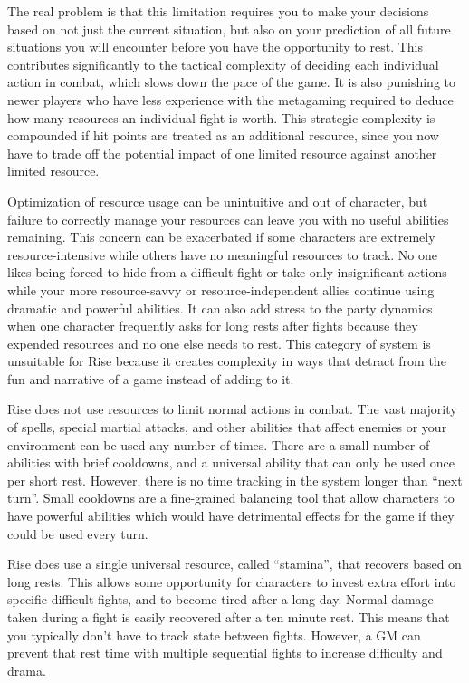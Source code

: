     The real problem is that this limitation requires you to make your decisions based on not just the current situation, but also on your prediction of all future situations you will encounter before you have the opportunity to rest.
    This contributes significantly to the tactical complexity of deciding each individual action in combat, which slows down the pace of the game.
    It is also punishing to newer players who have less experience with the metagaming required to deduce how many resources an individual fight is worth.
    This strategic complexity is compounded if hit points are treated as an additional resource, since you now have to trade off the potential impact of one limited resource against another limited resource.

    Optimization of resource usage can be unintuitive and out of character, but failure to correctly manage your resources can leave you with no useful abilities remaining.
    This concern can be exacerbated if some characters are extremely resource-intensive while others have no meaningful resources to track.
    No one likes being forced to hide from a difficult fight or take only insignificant actions while your more resource-savvy or resource-independent allies continue using dramatic and powerful abilities.
    It can also add stress to the party dynamics when one character frequently asks for long rests after fights because they expended resources and no one else needs to rest.
    This category of system is unsuitable for Rise because it creates complexity in ways that detract from the fun and narrative of a game instead of adding to it.

    Rise does not use resources to limit normal actions in combat.
    The vast majority of spells, special martial attacks, and other abilities that affect enemies or your environment can be used any number of times.
    There are a small number of abilities with brief cooldowns, and a universal ability that can only be used once per short rest.
    However, there is no time tracking in the system longer than ``next turn''.
    Small cooldowns are a fine-grained balancing tool that allow characters to have powerful abilities which would have detrimental effects for the game if they could be used every turn.

    Rise does use a single universal resource, called ``stamina'', that recovers based on long rests.
    This allows some opportunity for characters to invest extra effort into specific difficult fights, and to become tired after a long day.
    Normal damage taken during a fight is easily recovered after a ten minute rest.
    This means that you typically don't have to track state between fights.
    However, a GM can prevent that rest time with multiple sequential fights to increase difficulty and drama.

